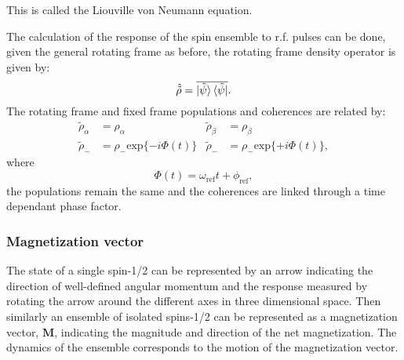 This is called the Liouville von Neumann equation.

The calculation of the response of the spin ensemble to r.f. pulses can be done, given the
general rotating frame as before, the rotating frame density operator is given by:
\begin{equation}
  \hat{\tilde{\rho}} = \overline{\ket{\tilde{\psi}}\bra{\tilde{\psi}}}.
\end{equation}
The rotating frame and fixed frame populations and coherences are related by:
\begin{align}\label{eqn:DensityRotFrame}
  \tilde{\rho}_\alpha &= \rho_\alpha & \tilde{\rho}_\beta &= \rho_\beta\\
  \tilde{\rho}_- &= \rho_-\text{exp}\{-i\Phi(t)\} & \tilde{\rho}_- &= \rho_-\text{exp}\{+i\Phi(t)\},
\end{align}
where
\begin{equation}
  \Phi(t) = \omega_{\text{ref}}t + \phi_{\text{ref}},
\end{equation}
the populations remain the same and the coherences are linked through a time dependant phase factor.

\subsubsection{Magnetization vector}

The state of a single spin-1/2 can be represented by an arrow indicating the direction of well-defined angular momentum and
the response measured by rotating the arrow around the different axes in three dimensional space. Then similarly
an ensemble of isolated spins-1/2 can be represented as a magnetization vector, $\mathbf{M}$, indicating the magnitude
and direction of the net magnetization. The dynamics of the ensemble corresponds to the motion of the magnetization vector.

